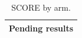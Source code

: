 \begin{table}[t]\centering
\caption{SCORE by arm.}\label{tab:scores}
\begin{tabular}{l}\toprule Pending results \\ \bottomrule\end{tabular}
\end{table}

